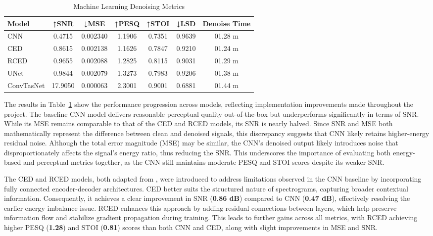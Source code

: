 \vspace{1em}
\begin{table}[H]
\centering
\caption{Machine Learning Denoising Metrics}
\label{tab:ml_denoise}
\begin{tabular}{|l|c|c|c|c|c|c|}
\hline
\textbf{Model} & \textbf{↑SNR} & \textbf{↓MSE} & \textbf{↑PESQ} & \textbf{↑STOI} & \textbf{↓LSD} & \textbf{Denoise Time} \\
\hline
CNN         & 0.4715  & 0.002340 & 1.1906 & 0.7351 & 0.9639 & 01.28 m \\
CED         & 0.8615  & 0.002138 & 1.1626 & 0.7847 & 0.9210 & 01.24 m \\
RCED        & 0.9655  & 0.002088 & 1.2825 & 0.8115 & 0.9031 & 01.29 m \\
UNet        & 0.9844  & 0.002079 & 1.3273 & 0.7983 & 0.9206 & 01.38 m \\
ConvTasNet  & 17.9050 & 0.000063 & 2.3001 & 0.9001 & 0.6881 & 01.44 m \\
\hline
\end{tabular}
\end{table}
The results in Table~\ref{tab:ml_denoise} show the performance progression across models, reflecting implementation improvements made throughout the project. The baseline CNN model delivers reasonable perceptual quality out-of-the-box but underperforms significantly in terms of SNR. While its MSE remains comparable to that of the CED and RCED models, its SNR is nearly halved. Since SNR and MSE both mathematically represent the difference between clean and denoised signals, this discrepancy suggests that CNN likely retains higher-energy residual noise. Although the total error magnitude (MSE) may be similar, the CNN's denoised output likely introduces noise that disproportionately affects the signal's energy ratio, thus reducing the SNR. This underscores the importance of evaluating both energy-based and perceptual metrics together, as the CNN still maintains moderate PESQ and STOI scores despite its weaker SNR.

The CED and RCED models, both adapted from \cite{park2017acoustic}, were introduced to address limitations observed in the CNN baseline by incorporating fully connected encoder-decoder architectures. CED better suits the structured nature of spectrograms, capturing broader contextual information. Consequently, it achieves a clear improvement in SNR (\textbf{0.86 dB}) compared to CNN (\textbf{0.47 dB}), effectively resolving the earlier energy imbalance issue. RCED enhances this approach by adding residual connections between layers, which help preserve information flow and stabilize gradient propagation during training. This leads to further gains across all metrics, with RCED achieving higher PESQ (\textbf{1.28}) and STOI (\textbf{0.81}) scores than both CNN and CED, along with slight improvements in MSE and SNR.

